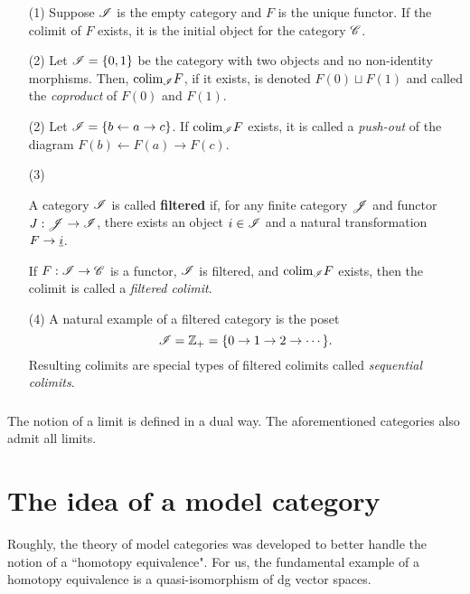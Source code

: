 \documentclass[11pt]{amsart}
\def\colim{{\rm colim}}
\begin{document}
\begin{eg}
\begin{enumerate}
\item[(1)] Suppose $\mathscr I$ is the empty category and $F$ is the unique functor. 
If the colimit of $F$ exists, it is the initial object for the category $\mathscr C$. 
\item[(2)] 
Let $\mathscr I = \{0,1\}$ be the category with two objects and no non-identity morphisms. 
Then, $\colim_{\sI} F$, if it exists, is denoted $F(0) \sqcup F(1)$ and called the {\em coproduct} of $F(0)$ and $F(1)$. 
\item[(2)] Let $\mathscr I = \{b \leftarrow a \to c\}$.
If $\colim_{\sI} F$ exists, it is called a {\em push-out} of the diagram $F(b) \leftarrow F(a) \to F(c)$. \\

\item[(3)]

\begin{dfn}
A category $\mathscr I$ is called {\bf filtered} if, for any finite category $\mathscr J$ and functor $J : \mathscr J \to \mathscr I$, there exists an object $i \in \mathscr I$ and a natural transformation $F \to \underline{i}$. 
\end{dfn}

If $F : \mathscr I \to \mathscr C$ is a functor, $\mathscr I$ is filtered, and $\colim_{\sI} F$ exists, then the colimit is called a {\em filtered colimit}. 

\item[(4)] A natural example of a filtered category is the poset
\[
\mathscr I = \mathbb Z_+ = \{0 \to 1 \to 2 \to \cdots \} .
\]
Resulting colimits are special types of filtered colimits called {\em sequential colimits}. 
\end{enumerate}
\end{eg}

\subsubsection{}
The notion of a limit is defined in a dual way. 
The aforementioned categories also admit all limits. 

\section{The idea of a model category}
Roughly, the theory of model categories was developed to better handle the notion of a ``homotopy equivalence". 
For us, the fundamental example of a homotopy equivalence is a quasi-isomorphism of dg vector spaces. 
\end{document}
